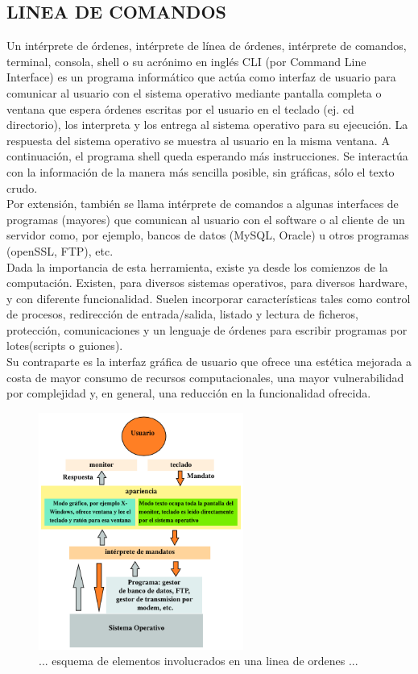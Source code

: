 \subsection{LINEA DE COMANDOS}

Un intérprete de órdenes, intérprete de línea de órdenes, intérprete de comandos, terminal, consola, shell o su acrónimo en inglés CLI (por Command Line Interface) es un programa informático que actúa como interfaz de usuario para comunicar al usuario con el sistema operativo mediante pantalla completa o ventana que espera órdenes escritas por el usuario en el teclado (ej. cd directorio), los interpreta y los entrega al sistema operativo para su ejecución. La respuesta del sistema operativo se muestra al usuario en la misma ventana. A continuación, el programa shell queda esperando más instrucciones. Se interactúa con la información de la manera más sencilla posible, sin gráficas, sólo el texto crudo.\\

Por extensión, también se llama intérprete de comandos a algunas interfaces de programas (mayores) que comunican al usuario con el software o al cliente de un servidor como, por ejemplo, bancos de datos (MySQL, Oracle) u otros programas (openSSL, FTP), etc.\\

Dada la importancia de esta herramienta, existe ya desde los comienzos de la computación. Existen, para diversos sistemas operativos, para diversos hardware, y con diferente funcionalidad. Suelen incorporar características tales como control de procesos, redirección de entrada/salida, listado y lectura de ficheros, protección, comunicaciones y un lenguaje de órdenes para escribir programas por lotes(scripts o guiones).\\

Su contraparte es la interfaz gráfica de usuario que ofrece una estética mejorada a costa de mayor consumo de recursos computacionales, una mayor vulnerabilidad por complejidad y, en general, una reducción en la funcionalidad ofrecida.\\

\begin{figure}[htb]
\centering
\includegraphics[width=0.6\textwidth]{imagenes/lineaDeComandos.png}%
\caption{... esquema de elementos involucrados en una linea de ordenes ...}
\label{contexto:figura}
\end{figure}


%
